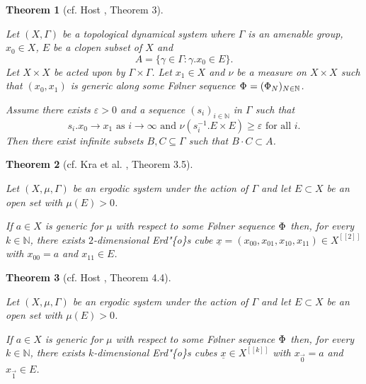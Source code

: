 \documentclass[
  british,
]{article}
\theoremstyle{plain}
\theoremstyle{definition}
\theoremstyle{plain}
\newtheorem{theorem}{Theorem}[section]
\theoremstyle{remark}
\newcommand{\GroupAction}[2]{{#1}.{#2}}
\newcommand{\AmenableGroup}{{\Gamma}}
\newcommand{\Folner}[1][{\vphantom{}}]{{\Phi}_{#1}}
\newcommand{\Measure}{{\mu}}
\newcommand{\AmenableGroupElement}{{\gamma}}
\newcommand{\N}{\mathbb{N}}
\newcommand{\GroupOperation}[2]{{#1}\cdot{#2}}
\begin{document}
\begin{theorem}[cf. Host , Theorem
3]\protect\hypertarget{thm-GenErdosConjDyn}{}\label{thm-GenErdosConjDyn}

Let \((X,\AmenableGroup)\) be a topological dynamical system where
\(\AmenableGroup\) is an amenable group, \(x_0\in X\), \(E\) be a clopen
subset of \(X\) and
\[A=\{\AmenableGroupElement\in\AmenableGroup:\GroupAction{\AmenableGroupElement}{x_0}\in E\}.\]
Let \(X\times X\) be acted upon by
\(\AmenableGroup\times\AmenableGroup\). Let \(x_1\in X\) and \(\nu\) be
a measure on \(X\times X\) such that \((x_0,x_1)\) is generic along some
Følner sequence \(\Folner=(\Folner[N])_{N\in\N}\).

Assume there exists \(\varepsilon>0\) and a sequence \((s_i)_{i\in\N}\)
in \(\AmenableGroup\) such that
\[\GroupAction{s_i}{x_0}\rightarrow x_1\text{ as }i\rightarrow\infty\text{ and }\nu(\GroupAction{s_i^{-1}}{E}\times E)\geq\varepsilon\text{ for all }i. \]
Then there exist infinite subsets \(B,C\subseteq \AmenableGroup\) such
that \(\GroupOperation{B}{C}\subset A\).

\end{theorem}

\begin{theorem}[cf. Kra et al. ,
Theorem
3.5]\protect\hypertarget{thm-GenErdosConjCube}{}\label{thm-GenErdosConjCube}

Let \((X,\Measure,\AmenableGroup)\) be an ergodic system under the
action of \(\AmenableGroup\) and let \(E\subset X\) be an open set with
\(\Measure(E)>0\).

If \(a\in X\) is generic for \(\Measure\) with respect to some Følner
sequence \(\Folner\) then, for every \(k\in\N\), there exists
\(2\)-dimensional Erd"\{o\}s cube
\(\underline{x}=(x_{00},x_{01},x_{10},x_{11})\in X^{[[2]]}\) with
\(x_{00}=a\) and \(x_{11}\in E\).

\end{theorem}

\begin{theorem}[cf. Host , Theorem
4.4]\protect\hypertarget{thm-GenNErdosConjCube}{}\label{thm-GenNErdosConjCube}

Let \((X,\Measure,\AmenableGroup)\) be an ergodic system under the
action of \(\AmenableGroup\) and let \(E\subset X\) be an open set with
\(\Measure(E)>0\).

If \(a\in X\) is generic for \(\Measure\) with respect to some Følner
sequence \(\Folner\) then, for every \(k\in\N\), there exists
\(k\)-dimensional Erd"\{o\}s cubes \(\underline{x}\in X^{[[k]]}\) with
\(x_{\vec{0}}=a\) and \(x_{\vec{1}}\in E\).

\end{theorem}
\end{document}
